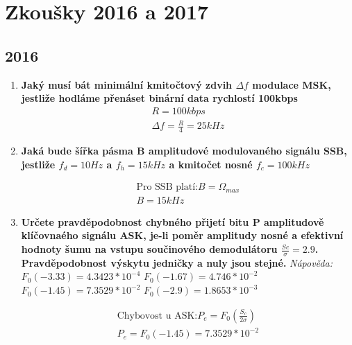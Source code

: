 \section{Zkoušky 2016 a 2017}
\subsection{2016}
\begin{enumerate}
    \item \textbf{Jaký musí bát minimální kmitočtový zdvih $\Delta f$ modulace MSK, jestliže hodláme přenáset binární data rychlostí 100kbps}
    \begin{gather*}
        R=100 kbps \\
        \Delta f=\frac{R}{4}=25kHz
    \end{gather*}
    \item \textbf{Jaká bude šířka pásma B amplitudové modulovaného signálu SSB,  jestliže $f_d=10Hz$ a $f_h=15kHz$ a kmitočet nosné $f_c=100kHz$}

    \begin{gather*}
        \textrm{Pro SSB platí:} B = \Omega_{max} \\
        B=15kHz
    \end{gather*}
    
    \item \textbf{Určete pravděpodobnost chybného přijetí bitu P amplitudově klíčovnaého signálu ASK, je-li poměr amplitudy nosné a efektivní hodnoty šumu na vstupu součinového demodulátoru $\frac{Sc}{\sigma}=2.9$. Pravděpodobnost výskytu jedničky a nuly jsou stejné.}
    \textit{Nápověda:}
    \textit{$F_0(-3.33)=4.3423*10^{-4}$}
    \textit{$F_0(-1.67)=4.746*10^{-2}$}
    \textit{$F_0(-1.45)=7.3529*10^{-2}$}
    \textit{$F_0(-2.9)=1.8653*10^{-3}$}

    \begin{gather*}
        \textrm{Chybovost u ASK:} P_e=F_0(\frac{S_c}{2\sigma}) \\
        P_e=F_0(-1.45)=7.3529*10^{-2}
    \end{gather*}


\end{enumerate}
